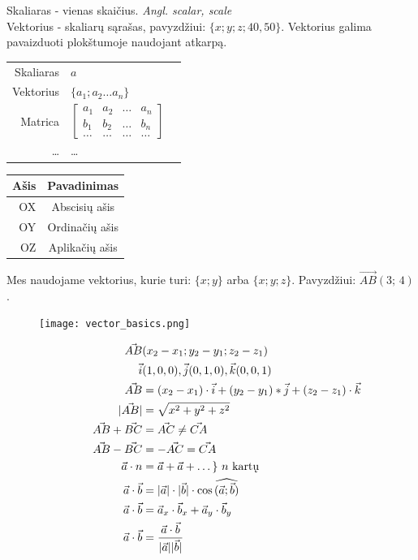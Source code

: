 
Skaliaras - vienas skaičius. \textit{Angl. scalar, scale} \\
Vektorius - skaliarų sąrašas, pavyzdžiui: $\{x; y; z; 40, 50\}$. Vektorius galima pavaizduoti plokštumoje naudojant atkarpą.

\begin{table}[h]
    \begin{tabular}{rll}
        Skaliaras & $a$ \\
        Vektorius & $\{a_1; a_2 \dots a_n\}$\\
        Matrica   & $\begin{bmatrix}
            a_1 & a_2 & \dots & a_n \\
            b_1 & b_2 & \dots & b_n \\
            \dots & \dots & \dots & \dots
        \end{bmatrix}$ \\
        \dots & \dots
    \end{tabular}
    \hspace{40mm}
    \begin{tabular}{rc}
        Ašis & Pavadinimas \\ \hline
        OX & Abscisių ašis \\
        OY & Ordinačių ašis \\
        OZ & Aplikačių ašis
    \end{tabular}
\end{table}
Mes naudojame vektorius, kurie turi: $\{x; y\}$ arba $\{x; y; z\}$. Pavyzdžiui: $\vec{AB}(3;\,4)$.

\begin{figure}
\texttt{[image: vector\_basics.png]}
\end{figure}

\begin{equation}
    \hspace{10mm}
    \begin{aligned}
        \vec{AB} & (x_2 - x_1; y_2 - y_1; z_2 - z_1) \\
        \vec{i} & (1, 0, 0), \vec{j}(0, 1, 0), \vec{k}(0, 0, 1) \\
        \vec{AB} &= (x_2 - x_1) \cdot \vec{i} + (y_2 - y_1) * \vec{j} + (z_2 - z_1) \cdot \vec{k} \\
        |\vec{AB}| &= \sqrt{x^2 + y^2 + z^2} \\
        \vec{AB} + \vec{BC} &= \vec{AC} \ne \vec{CA} \\
        \vec{AB} - \vec{BC} &= -\vec{AC} = \vec{CA} \\
        \vec{a} \cdot n &= \vec{a} + \vec{a} + \dots \}\ n \text{ kartų} \\
        \vec{a} \cdot \vec{b} &= |\vec{a}| \cdot |\vec{b}| \cdot \cos{\widehat{(\vec{a}; \vec{b})}} \\
        \vec{a} \cdot \vec{b} &= \vec{a}_x \cdot \vec{b}_x + \vec{a}_y \cdot \vec{b}_y \\
        \vec{a} \cdot \vec{b} &= \frac{\vec{a} \cdot \vec{b}}{|\vec{a}||\vec{b}|}
    \end{aligned}
\end{equation}

